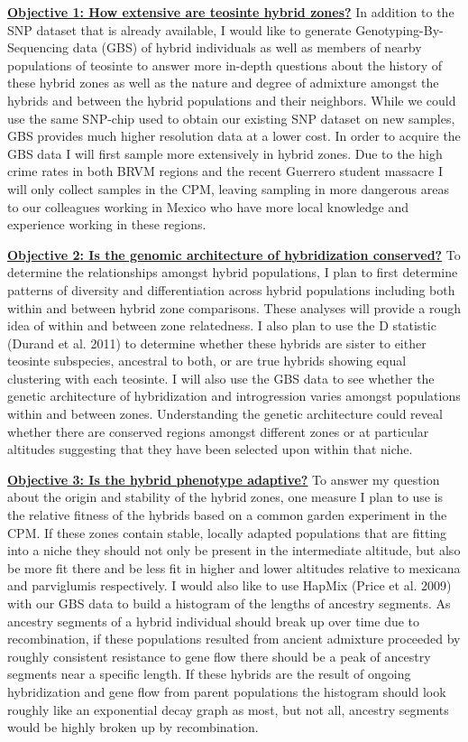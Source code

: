\documentclass[12pt]{amsart}
\begin{document}
\hfill\break \textbf{\underline{Objective 1: How extensive are teosinte hybrid zones?} } 
In addition to the SNP dataset that is already available, I would like to generate Genotyping-By-Sequencing data (GBS) of hybrid individuals as well as members of nearby populations of teosinte to answer more in-depth questions about the history of these hybrid zones as well as the nature and degree of admixture amongst the hybrids and between the hybrid populations and their neighbors.  
While we could use the same SNP-chip used to obtain our existing SNP dataset on new samples, GBS provides much higher resolution data at a lower cost.
In order to acquire the GBS data I will first sample more extensively in hybrid zones.  
Due to the high crime rates in both BRVM regions and the recent Guerrero student massacre I will only collect samples in the CPM, leaving sampling in more dangerous areas to our colleagues working in Mexico who have more local knowledge and experience working in these regions.

\hfill\break \textbf{\underline{Objective 2: Is the genomic architecture of hybridization conserved?} } To determine the relationships amongst hybrid populations, I plan to first determine patterns of diversity and differentiation across hybrid populations including both within and between hybrid zone comparisons.
These analyses will provide a rough idea of within and between zone relatedness.
I also plan to use the D statistic (Durand et al. 2011) to determine whether these hybrids are sister to either teosinte subspecies, ancestral to both, or are true hybrids showing equal clustering with each teosinte.
I will also use the GBS data to see whether the genetic architecture of hybridization and introgression varies amongst populations within and between zones.
Understanding the genetic architecture could reveal whether there are conserved regions amongst different zones or at particular altitudes suggesting that they have been selected upon within that niche.

\hfill\break \textbf{\underline{Objective 3: Is the hybrid phenotype adaptive?} }To answer my question about the origin and stability of the hybrid zones, one measure I plan to use is the relative fitness of the hybrids based on a common garden experiment in the CPM. 
If these zones contain stable, locally adapted populations that are fitting into a niche they should not only be present in the intermediate altitude, but also be more fit there and be less fit in higher and lower altitudes relative to mexicana and parviglumis respectively.
I would also like to use HapMix (Price et al. 2009) with our GBS data to build a histogram of the lengths of ancestry segments.
As ancestry segments of a hybrid individual should break up over time due to recombination, if these populations resulted from ancient admixture proceeded by roughly consistent resistance to gene flow there should be a peak of ancestry segments near a specific length.
If these hybrids are the result of ongoing hybridization and gene flow from parent populations the histogram should look roughly like an exponential decay graph as most, but not all, ancestry segments would be highly broken up by recombination.
\end{document}
